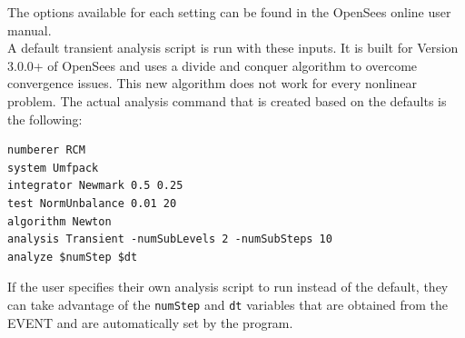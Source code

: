 The options available for each setting can be found in the OpenSees online user
manual.\\

A default transient analysis script is run with these inputs. It is
built for Version 3.0.0+ of OpenSees and uses a divide and conquer
algorithm to overcome convergence issues. This new algorithm
does not work for every nonlinear problem. The actual analysis command
that is created based on the defaults is the following:

\begin{verbatim}
numberer RCM
system Umfpack
integrator Newmark 0.5 0.25
test NormUnbalance 0.01 20 
algorithm Newton
analysis Transient -numSubLevels 2 -numSubSteps 10 
analyze $numStep $dt
\end{verbatim}

If the user specifies their own analysis script to run
instead of the default, they can take advantage of the \texttt{numStep} and \texttt{dt} variables that
are obtained from the EVENT and are automatically set by the program.
